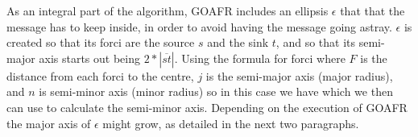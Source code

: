As an integral part of the algorithm, GOAFR includes an ellipsis $\epsilon$ that that the message has to keep inside, in order to avoid having the message going astray. $\epsilon$ is created so that its forci are the source $s$ and the sink $t$, and so that its semi-major axis starts out being $2 * |\overline{st}|$. Using the formula for forci
where $F$ is the distance from each forci to the centre, $j$ is the semi-major axis (major radius), and $n$ is semi-minor axis (minor radius) so in this case we have
which we then can use to calculate the semi-minor axis. Depending on the execution of GOAFR the major axis of $\epsilon$ might grow, as detailed in the next two paragraphs.

